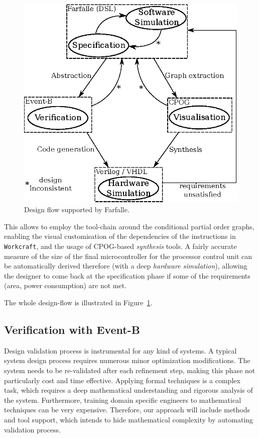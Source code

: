 \documentclass[conference]{IEEEtran}
\begin{document}
\begin{figure}[ht!]
\begin{center}
	\includegraphics[width=\linewidth]{IMG/flow_new.eps}
	\caption{Design flow supported by Farfalle.}
	\label{fig:flow}
\end{center}
\end{figure}

This allows to employ the tool-chain around the conditional partial order
graphs, enabling the visual customisation of the dependencies of the instructions in 
\verb|Workcraft|, and the usage of CPOG-based \textit{synthesis} tools. A fairly
accurate measure of the size of the final microcontroller for the processor control
unit can be automatically derived therefore (with a deep \textit{hardware simulation}),
allowing the designer to come back at the specification phase if some of the requirements
(area, power consumption) are not met.

The whole design-flow is illustrated in Figure~\ref{fig:flow}.

\subsection{Verification with Event-B}
\label{sec:ver}
Design validation process is instrumental for any kind of systems. A typical system design
process requires numerous minor optimization modifications. The system needs to be 
re-validated after each refinement step, making this phase not particularly cost and time
effective. Applying formal techniques is a complex task, which requires a deep mathematical
understanding and rigorous analysis of the system. Furthermore, training domain specific
engineers to mathematical techniques can be very expensive. Therefore, our approach will
include methods and tool support, which intends to hide mathematical complexity by automating
validation process. 
\end{document}
